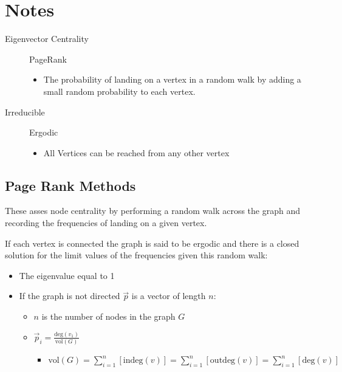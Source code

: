 \documentclass[11pt]{article}
\begin{document}
\section{Notes}
\label{sec:orgf9d20e4}

\begin{description}
\item[{Eigenvector Centrality}] PageRank

\begin{itemize}
\item The probability of landing on a vertex in a random walk by adding a small random probability to each vertex.
\end{itemize}

\item[{Irreducible}] Ergodic
\begin{itemize}
\item All Vertices can be reached from any other vertex
\end{itemize}
\end{description}

\subsection{Page Rank Methods}
\label{sec:orgd033a51}

These asses node centrality by performing a random walk across the graph and recording the frequencies of landing on a given vertex.

If each vertex is connected the graph is said to be ergodic and there is a closed solution for the limit values of the frequencies given this random walk:

\begin{itemize}
\item The eigenvalue equal to 1
\item If the graph is not directed \(\vec{p}\) is a vector of length \(n\):
\begin{itemize}
\item \(n\) is the number of nodes in the graph \(G\)
\item \(\vec{p}_{i} = \frac{\mathrm{deg}(v_{1})}{\mathrm{vol}(G)}\)
\begin{itemize}
\item \(\mathrm{vol}(G) = \sum^{n}_{i = 1} \left[ \mathrm{indeg}(v) \right] = \sum^{n}_{i = 1} \left[ \mathrm{outdeg}(v) \right ] = \sum^{n}_{i = 1} \left[ \mathrm{deg}(v) \right]\)
\end{itemize}
\end{itemize}
\end{itemize}
\end{document}
